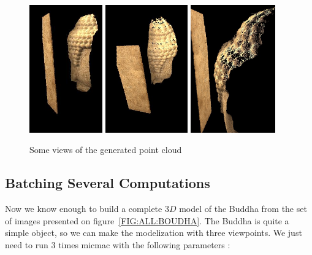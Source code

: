 \begin{figure}
\begin{center}
\includegraphics[height=55mm]{FIGS/Boudhas/PL-F1-A.jpg}
\includegraphics[height=55mm]{FIGS/Boudhas/PL-F1-B.jpg}
\includegraphics[height=55mm]{FIGS/Boudhas/PL-F1-C.jpg}
\caption{Some views of the generated point cloud}
\label{BOUDHA:CLOUD:OUTPUT}
\end{center}
\end{figure}


\subsection{Batching Several Computations}

Now we know  enough to build a complete $3D$ model of the
Buddha from the set of images presented on figure~\ref{FIG:ALL:BOUDHA}.
The Buddha is quite a simple object, so we can make the modelization with three
viewpoints. We just need to run $3$ times micmac with the following
parameters :


